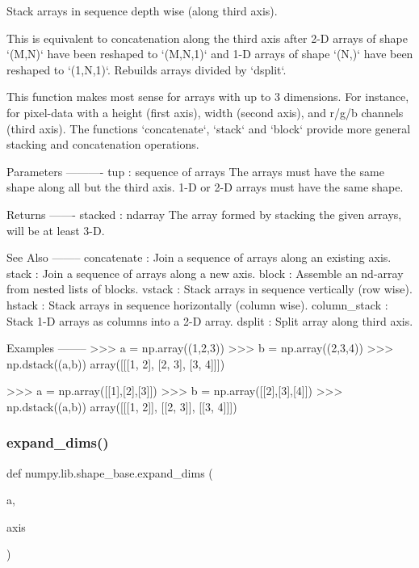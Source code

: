 \begin{DoxyVerb}Stack arrays in sequence depth wise (along third axis).

This is equivalent to concatenation along the third axis after 2-D arrays
of shape `(M,N)` have been reshaped to `(M,N,1)` and 1-D arrays of shape
`(N,)` have been reshaped to `(1,N,1)`. Rebuilds arrays divided by
`dsplit`.

This function makes most sense for arrays with up to 3 dimensions. For
instance, for pixel-data with a height (first axis), width (second axis),
and r/g/b channels (third axis). The functions `concatenate`, `stack` and
`block` provide more general stacking and concatenation operations.

Parameters
----------
tup : sequence of arrays
    The arrays must have the same shape along all but the third axis.
    1-D or 2-D arrays must have the same shape.

Returns
-------
stacked : ndarray
    The array formed by stacking the given arrays, will be at least 3-D.

See Also
--------
concatenate : Join a sequence of arrays along an existing axis.
stack : Join a sequence of arrays along a new axis.
block : Assemble an nd-array from nested lists of blocks.
vstack : Stack arrays in sequence vertically (row wise).
hstack : Stack arrays in sequence horizontally (column wise).
column_stack : Stack 1-D arrays as columns into a 2-D array.
dsplit : Split array along third axis.

Examples
--------
>>> a = np.array((1,2,3))
>>> b = np.array((2,3,4))
>>> np.dstack((a,b))
array([[[1, 2],
        [2, 3],
        [3, 4]]])

>>> a = np.array([[1],[2],[3]])
>>> b = np.array([[2],[3],[4]])
>>> np.dstack((a,b))
array([[[1, 2]],
       [[2, 3]],
       [[3, 4]]])\end{DoxyVerb}
 \mbox{\label{namespacenumpy_1_1lib_1_1shape__base_ab6c13a41184cfe5841e1e8d50a06a8f1}} 
\subsubsection{\texorpdfstring{expand\+\_\+dims()}{expand\_dims()}}
{\footnotesize\ttfamily def numpy.\+lib.\+shape\+\_\+base.\+expand\+\_\+dims (\begin{DoxyParamCaption}\item[{}]{a,  }\item[{}]{axis }\end{DoxyParamCaption})}

